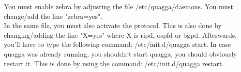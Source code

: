 You must enable zebra by adjusting the file /etc/quagga/daemons. You must change/add the line "zebra=yes". \\
In the same file, you must also activate the protocol. This is also done by changing/adding the line "X=yes" where X is ripd, ospfd or bgpd.
Afterwards, you'll have to type the following command: /etc/init.d/quagga start.
In case quagga was already running, you shouldn't start quagga, you should obviously restart it. This is done by using the command: /etc/init.d/quagga restart.